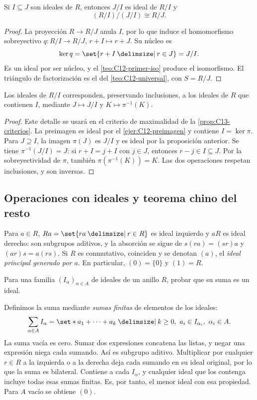 \begin{prop}\label{prop:C12-tercer-iso}
Si $I\subseteq J$ son ideales de $R$, entonces $J/I$ es ideal de $R/I$ y
\[
(R/I)/(J/I)\cong R/J.
\]
\end{prop}
\begin{proof}
La proyección $R\to R/J$ anula $I$, por lo que induce el homomorfismo sobreyectivo $q:R/I\to R/J$, $r+I\mapsto r+J$. Su núcleo es
\[
\ker q=\set{r+I\given r\in J}=J/I.
\]
Es un ideal por ser núcleo, y el \cref{teo:C12-primer-iso} produce el isomorfismo. El triángulo de factorización es el del \cref{teo:C12-universal}, con $S=R/J$.
\end{proof}

\begin{lema}\label{lema:C12-correspondencia}
Los ideales de $R/I$ corresponden, preservando inclusiones, a los ideales de $R$ que contienen $I$, mediante $J\mapsto J/I$ y $K\mapsto\pi^{-1}(K)$.
\end{lema}
\begin{proof}
Este detalle se usará en el criterio de maximalidad de la \cref{prop:C13-criterios}. La preimagen es ideal por el \cref{ejer:C12-preimagen} y contiene $I=\ker\pi$. Para $J\supseteq I$, la imagen $\pi(J)$ es $J/I$ y es ideal por la proposición anterior. Se tiene $\pi^{-1}(J/I)=J$: si $r+I=j+I$ con $j\in J$, entonces $r-j\in I\subseteq J$. Por la sobreyectividad de $\pi$, también $\pi(\pi^{-1}(K))=K$. Las dos operaciones respetan inclusiones, y son inversas.
\end{proof}

\subsection{Operaciones con ideales y teorema chino del resto}\label{tema:12-3-1}\label{tema:21-2-2a}
Para $a\in R$, $Ra=\set{ra\given r\in R}$ es ideal izquierdo y $aR$ es ideal derecho: son subgrupos aditivos, y la absorción se sigue de $s(ra)=(sr)a$ y $(ar)s=a(rs)$. Si $R$ es conmutativo, coinciden y se denotan $(a)$, el \emph{ideal principal generado por $a$}. En particular, $(0)=\{0\}$ y $(1)=R$.

\begin{ejer}\label{ejer:C12-suma}
Para una familia $(I_\alpha)_{\alpha\in A}$ de ideales de un anillo $R$, probar que su suma es un ideal.
\end{ejer}
\begin{sol}
Definimos la suma mediante \emph{sumas finitas} de elementos de los ideales:
\[
\sum_{\alpha\in A}I_\alpha
=\set*{a_1+\cdots+a_k\given
 k\geq0,\ a_i\in I_{\alpha_i},\ \alpha_i\in A}.
\]
La suma vacía es cero. Sumar dos expresiones concatena las listas, y negar una expresión niega cada sumando. Así es subgrupo aditivo. Multiplicar por cualquier $r\in R$ a la izquierda o a la derecha deja cada sumando en su ideal original, por lo que la suma es bilateral. Contiene a cada $I_\alpha$, y cualquier ideal que los contenga incluye todas esas sumas finitas. Es, por tanto, el menor ideal con esa propiedad. Para $A$ vacío se obtiene $(0)$.
\end{sol}

